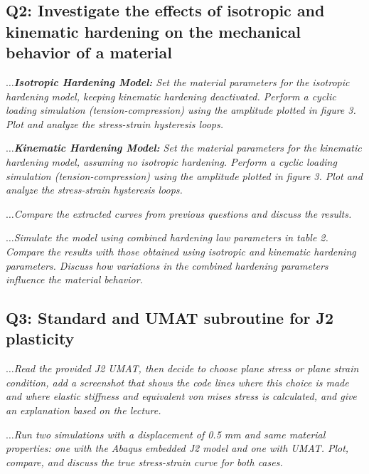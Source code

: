 \documentclass[12pt]{article}
\begin{document}
\newpage
\subsection*{Q2: Investigate the effects of isotropic and kinematic hardening on the mechanical behavior of a material}

\vspace{1em}
\textit{$\dots$\textbf{Isotropic Hardening Model:} Set the material parameters for the 
isotropic hardening model, keeping kinematic hardening deactivated. 
Perform a cyclic loading simulation (tension-compression) 
using the amplitude plotted in figure 3. Plot and analyze the stress-strain hysteresis loops.}
\vspace{1em}

\textit{$\dots$\textbf{Kinematic Hardening Model:} Set the material parameters for 
the kinematic hardening model, assuming no isotropic hardening. 
Perform a cyclic loading simulation (tension-compression) using 
the amplitude plotted in figure 3. 
Plot and analyze the stress-strain hysteresis loops.}
\vspace{1em}

\textit{$\dots$Compare the extracted curves from previous questions and discuss the results.}
\vspace{1em}

\textit{$\dots$Simulate the model using combined hardening law parameters in table 2. 
Compare the results with those obtained using isotropic and kinematic hardening parameters. 
Discuss how variations in the combined hardening parameters influence the material behavior.}
\vspace{1em}

\subsection*{Q3: Standard and UMAT subroutine for J2 plasticity}
\vspace{1em}
\textit{$\dots$Read the provided J2 UMAT, then decide to choose plane stress or plane strain condition, add
a screenshot that shows the code lines where this choice is made and where elastic stiffness
and equivalent von mises stress is calculated, and give an explanation based on the lecture.}
\vspace{1em}

\textit{$\dots$Run two simulations with a displacement of 0.5 mm and same material properties: one with
the Abaqus embedded J2 model and one with UMAT. Plot, compare, and discuss the true stress-strain
curve for both cases.}
\vspace{1em}
\end{document}
